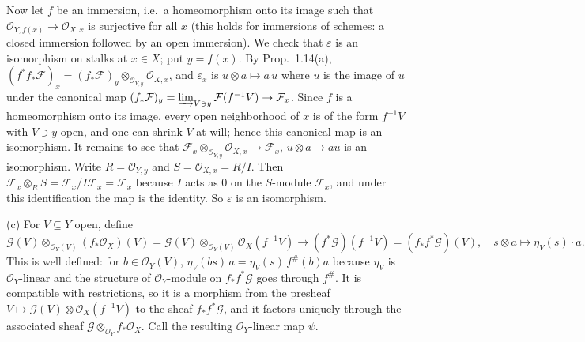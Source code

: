 \documentclass[11pt]{article}
\begin{document}
Now let $f$ be an immersion, i.e.\ a homeomorphism onto its image such that $\mathcal{O}_{Y,f(x)}\to\mathcal{O}_{X,x}$ is surjective for all $x$ (this holds for immersions of schemes: a closed immersion followed by an open immersion). We check that $\varepsilon$ is an isomorphism on stalks at $x\in X$; put $y=f(x)$. By Prop.~1.14(a), $(f^*f_*\mathcal{F})_x=(f_*\mathcal{F})_y\otimes_{\mathcal{O}_{Y,y}}\mathcal{O}_{X,x}$, and $\varepsilon_x$ is $u\otimes a\mapsto a\,\bar u$ where $\bar u$ is the image of $u$ under the canonical map $(f_*\mathcal{F})_y=\varinjlim_{V\ni y}\mathcal{F}(f^{-1}V)\to\mathcal{F}_x$. Since $f$ is a homeomorphism onto its image, every open neighborhood of $x$ is of the form $f^{-1}V$ with $V\ni y$ open, and one can shrink $V$ at will; hence this canonical map is an isomorphism. It remains to see that $\mathcal{F}_x\otimes_{\mathcal{O}_{Y,y}}\mathcal{O}_{X,x}\to\mathcal{F}_x$, $u\otimes a\mapsto au$ is an isomorphism. Write $R=\mathcal{O}_{Y,y}$ and $S=\mathcal{O}_{X,x}=R/I$. Then $\mathcal{F}_x\otimes_RS=\mathcal{F}_x/I\mathcal{F}_x=\mathcal{F}_x$ because $I$ acts as $0$ on the $S$-module $\mathcal{F}_x$, and under this identification the map is the identity. So $\varepsilon$ is an isomorphism.

(c) For $V\subseteq Y$ open, define
\[ \mathcal{G}(V)\otimes_{\mathcal{O}_Y(V)}(f_*\mathcal{O}_X)(V)=\mathcal{G}(V)\otimes_{\mathcal{O}_Y(V)}\mathcal{O}_X(f^{-1}V)\longrightarrow(f^*\mathcal{G})(f^{-1}V)=(f_*f^*\mathcal{G})(V),\quad s\otimes a\mapsto\eta_V(s)\cdot a. \]
This is well defined: for $b\in\mathcal{O}_Y(V)$, $\eta_V(bs)\,a=\eta_V(s)\,f^\#(b)a$ because $\eta_V$ is $\mathcal{O}_Y$-linear and the structure of $\mathcal{O}_Y$-module on $f_*f^*\mathcal{G}$ goes through $f^\#$. It is compatible with restrictions, so it is a morphism from the presheaf $V\mapsto\mathcal{G}(V)\otimes\mathcal{O}_X(f^{-1}V)$ to the sheaf $f_*f^*\mathcal{G}$, and it factors uniquely through the associated sheaf $\mathcal{G}\otimes_{\mathcal{O}_Y}f_*\mathcal{O}_X$. Call the resulting $\mathcal{O}_Y$-linear map $\psi$.
\end{document}
